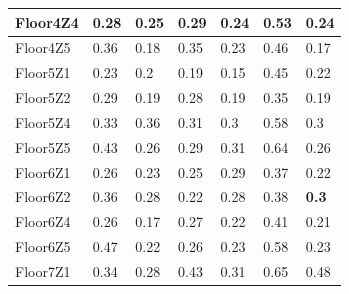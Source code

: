 \begin{table}[]
\begin{tabular}{|l|l|l|l|l|l|l|}
Floor4Z4 & 0.28                         & 0.25                            & 0.29                          & 0.24                             & 0.53                          & 0.24                     \\ \hline
Floor4Z5 & 0.36                         & 0.18                            & 0.35                          & 0.23                             & 0.46                          & 0.17                     \\ \hline
Floor5Z1 & 0.23                         & 0.2                             & 0.19                          & 0.15                             & 0.45                          & 0.22                     \\ \hline
Floor5Z2 & 0.29                         & 0.19                            & 0.28                          & 0.19                             & 0.35                          & 0.19                     \\ \hline
Floor5Z4 & 0.33                         & 0.36                            & 0.31                          & 0.3                              & 0.58                          & 0.3                      \\ \hline
Floor5Z5 & 0.43                         & 0.26                            & 0.29                          & 0.31                             & 0.64                          & 0.26                     \\ \hline
Floor6Z1 & 0.26                         & 0.23                            & 0.25                          & 0.29                             & 0.37                          & 0.22                     \\ \hline
Floor6Z2 & 0.36                         & 0.28                            & 0.22                          & 0.28                             & 0.38                          & \textbf{0.3  }                    \\ \hline
Floor6Z4 & 0.26                         & 0.17                            & 0.27                          & 0.22                             & 0.41                          & 0.21                     \\ \hline
Floor6Z5 & 0.47                         & 0.22                            & 0.26                          & 0.23                             & 0.58                          & 0.23                     \\ \hline
Floor7Z1 & 0.34                         & 0.28                            & 0.43                          & 0.31                             & 0.65                          & 0.48                     \\ \hline

\end{tabular}
\end{table}
